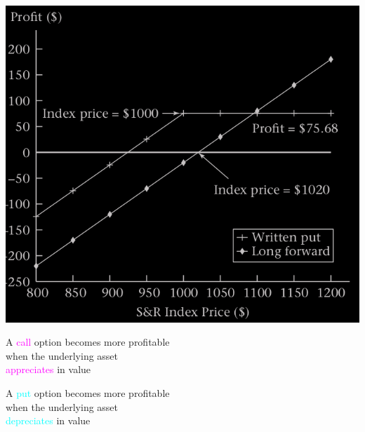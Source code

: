 \begin{frame}[fragile]
\begin{center}
	\includegraphics[scale=0.2]{figs/Figure-2-9.png}
\end{center}
\end{frame}
\begin{frame}[fragile]
	\begin{center}
		A \textcolor{magenta}{call} option becomes more profitable \\
		when the underlying asset                                  \\
		\textcolor{magenta}{appreciates} in value

		\bigskip
		\mySeparateLine
		\bigskip

		A \textcolor{cyan}{put} option becomes more profitable     \\
		when the underlying asset                                  \\
		\textcolor{cyan}{depreciates} in value
	\end{center}
\end{frame}
